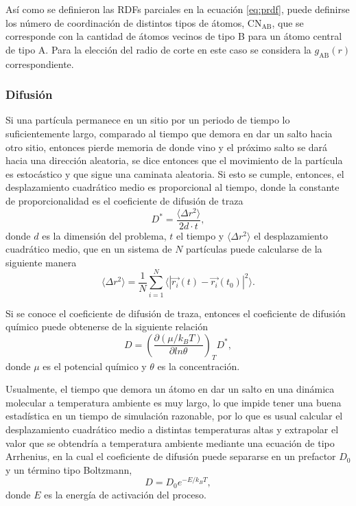 Así como se definieron las RDFs parciales en la ecuación \ref{eq:prdf}, puede 
definirse los número de coordinación de distintos tipos de átomos,
CN$_{\text{AB}}$, que se corresponde con la cantidad de átomos vecinos de tipo
B para un átomo central de tipo A. Para la elección del radio de corte en 
este caso se considera la $g_{\text{AB}}(r)$ correspondiente.

\subsubsection{Difusión}

Si una partícula permanece en un sitio por un periodo de tiempo lo 
suficientemente largo, comparado al tiempo que demora en dar un salto hacia otro
sitio, entonces pierde memoria de donde vino y el próximo salto se dará hacia 
una dirección aleatoria, se dice entonces que el movimiento de la partícula es 
estocástico y que sigue una caminata aleatoria. Si esto se cumple, entonces, el 
desplazamiento cuadrático medio es proporcional al tiempo, donde la constante de 
proporcionalidad es el coeficiente de difusión de traza
\begin{equation}
    D^{*} = \frac{\langle \Delta r^2 \rangle}{2d\cdot t},
\end{equation}
donde $d$ es la dimensión del problema, $t$ el tiempo y 
$\langle \Delta r^2 \rangle$ el desplazamiento cuadrático medio, que en un 
sistema de $N$ partículas puede calcularse de la siguiente manera
\begin{equation}
    \langle \Delta r^2 \rangle = \frac{1}{N} \sum_{i=1}^{N} \langle |\vec{r_i}(t) - \vec{r_i}(t_0)|^2 \rangle.
\end{equation}

Si se conoce el coeficiente de difusión de traza, entonces el coeficiente de 
difusión químico puede obtenerse de la siguiente relación ~\cite{gomer1990}
\begin{equation}
    D = \left( \frac{\partial (\mu / k_BT)}{\partial ln \theta} \right)_T D^{*},
\end{equation}
donde $\mu$ es el potencial químico y $\theta$ es la concentración.

Usualmente, el tiempo que demora un átomo en dar un salto en una dinámica 
molecular a temperatura ambiente es muy largo, lo que impide tener una buena 
estadística en un tiempo de simulación razonable, por lo que es usual calcular 
el desplazamiento cuadrático medio a distintas temperaturas altas y extrapolar
el valor que se obtendría a temperatura ambiente mediante una ecuación de tipo 
Arrhenius, en la cual el coeficiente de difusión puede separarse en un 
prefactor $D_0$ y un término tipo Boltzmann,
\begin{equation}
    D = D_0 e^{-E / k_BT},
\end{equation}
donde $E$ es la energía de activación del proceso. 


